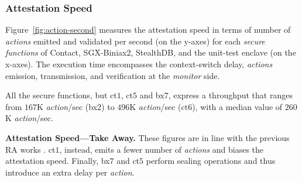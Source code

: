
\subsubsection{Attestation Speed}
\label{ssec:attesation-speed}

Figure~\ref{fig:action-second} measures the attestation speed in terms of 
number of \emph{actions} emitted and validated per second (on the y-axes) for 
each \emph{secure functions} of \textsf{Contact}, \textsf{SGX-Biniax2}, 
\textsf{StealthDB}, and the \textsf{unit-test} enclave (on the x-axes).
The execution time encompasses the context-switch delay, \emph{actions} 
emission, transmission, and verification at the \emph{monitor} side.

All the secure functions, but ct$1$, ct$5$ and bx$7$, express a throughput
that ranges from $167$K \emph{action}/sec (bx$2$) to $496$K 
\emph{action}/sec (ct$6$), with a median value of $260$K \emph{action}/sec.

\vspace{0.5cm}
\noindent \textbf{Attestation Speed---Take Away.}
These figures are in line with the previous RA works \citep{scarr}.
ct$1$, instead, emits a fewer number of  \emph{actions} and biases the 
attestation speed.
Finally, bx$7$ and ct$5$ perform sealing operations \citep{anati2013innovative} 
and thus introduce an extra delay per \emph{action}.


